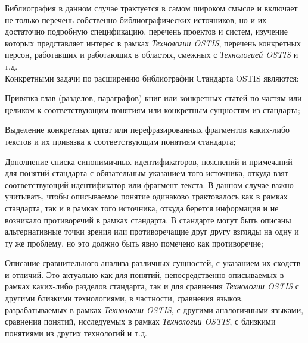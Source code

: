 {{{				Библиография в данном случае трактуется в самом широком смысле и включает не только перечень собственно библиографических источников, но и их достаточно подробную спецификацию, перечень проектов и систем, изучение которых представляет интерес в рамках \textit{Технологии OSTIS}, перечень конкретных персон, работавших  и работающих в областях, смежных с \textit{Технологией OSTIS} и т.д.\\
				Конкретными задачи по расширению библиографии Стандарта OSTIS являются:
				\begin{scnitemizeii}
					\item Привязка глав (разделов, параграфов) книг или конкретных статей по частям или целиком к соответствующим понятиям или конкретным сущностям из стандарта;\\
					\item Выделение конкретных цитат или перефразированных фрагментов каких-либо текстов и их привязка к соответствующим понятиям стандарта;\\
					\item Дополнение списка синонимичных идентификаторов, пояснений и примечаний для понятий стандарта с обязательным указанием того источника, откуда взят соответствующий идентификатор или фрагмент текста. В данном случае важно учитывать, чтобы описываемое понятие одинаково трактовалось как в рамках стандарта, так и в рамках того источника, откуда берется информация и не возникало противоречий в рамках стандарта. В стандарте могут быть описаны альтернативные точки зрения или противоречащие друг другу взгляды на одну и ту же проблему, но это должно быть явно помечено как противоречие;
					\item Описание сравнительного анализа различных сущностей, с указанием их сходств и отличий. Это актуально как для понятий, непосредственно описываемых в рамках каких-либо разделов стандарта, так и для сравнения \textit{Технологии OSTIS} с другими близкими технологиями, в частности, сравнения языков, разрабатываемых в рамках \textit{Технологии OSTIS}, с другими аналогичными языками, сравнения понятий, исследуемых в рамках \textit{Технологии OSTIS}, с близкими понятиями из других технологий и т.д.

\end{scnitemizeii}}}}
